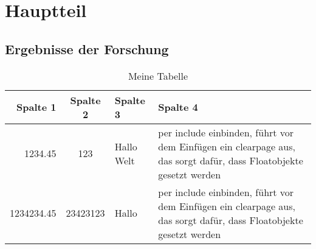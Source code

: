 \chapter{Hauptteil}
\section{Ergebnisse der Forschung}

\blindtext[20]

\begin{table}
\caption{Meine Tabelle}
\centering
\begin{tabular}{rclp{5cm}} \toprule[1.5pt]
\textbf{Spalte 1} & \textbf{Spalte 2} & \textbf{Spalte 3} & \textbf{Spalte 4} \\ \midrule
1234.45 & 123 & Hallo Welt & per include einbinden,  führt vor dem Einfügen ein clearpage aus, das sorgt dafür, dass Floatobjekte gesetzt werden \\
1234234.45 & 23423123 & Hallo &  per include einbinden,  führt vor dem Einfügen ein clearpage aus, das sorgt dafür, dass Floatobjekte gesetzt werden \\ \bottomrule[1.5pt]
\end{tabular}
\end{table}


\blindtext[20]


